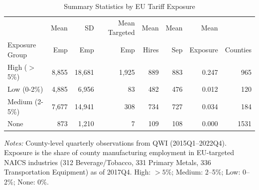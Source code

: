\begin{table}[htbp]
\centering
\caption{Summary Statistics by EU Tariff Exposure}
\label{tab:summary}
\begin{tabular}{lrrrrrrr}
\toprule
 & Mean & SD & Mean Targeted & Mean & Mean & Mean & \\
Exposure Group & Emp & Emp & Emp & Hires & Sep & Exposure & Counties \\
\midrule
High ($>$5\%) & 8,855 & 18,681 & 1,925 & 889 & 883 & 0.247 & 965 \\
Low (0-2\%) & 4,885 & 6,956 & 83 & 482 & 476 & 0.012 & 120 \\
Medium (2-5\%) & 7,677 & 14,941 & 308 & 734 & 727 & 0.034 & 184 \\
None & 873 & 1,210 & 7 & 109 & 108 & 0.000 & 1531 \\
\bottomrule
\end{tabular}
\begin{tablenotes}[flushleft]
\small
\item \textit{Notes:} County-level quarterly observations from QWI (2015Q1--2022Q4). Exposure is the share of county manufacturing employment in EU-targeted NAICS industries (312 Beverage/Tobacco, 331 Primary Metals, 336 Transportation Equipment) as of 2017Q4. High: $>5\%$; Medium: 2--5\%; Low: 0--2\%; None: 0\%.
\end{tablenotes}
\end{table}
